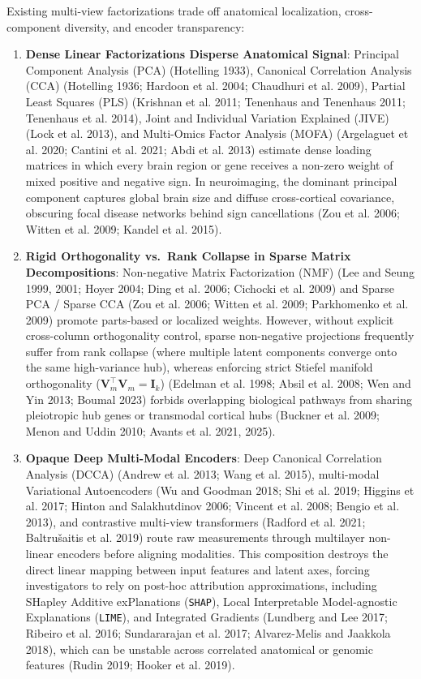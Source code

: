\documentclass[
  10pt,
  letterpaper,
]{report}
\providecommand{\tightlist}{%
  \setlength{\itemsep}{0pt}\setlength{\parskip}{0pt}}
\begin{document}
Existing multi-view factorizations trade off anatomical localization,
cross-component diversity, and encoder transparency:

\begin{enumerate}
\def\labelenumi{\arabic{enumi}.}
\tightlist
\item
  \textbf{Dense Linear Factorizations Disperse Anatomical Signal}:
  Principal Component Analysis (PCA) (Hotelling 1933), Canonical
  Correlation Analysis (CCA) (Hotelling 1936; Hardoon et al. 2004;
  Chaudhuri et al. 2009), Partial Least Squares (PLS) (Krishnan et al.
  2011; Tenenhaus and Tenenhaus 2011; Tenenhaus et al. 2014), Joint and
  Individual Variation Explained (JIVE) (Lock et al. 2013), and
  Multi-Omics Factor Analysis (MOFA) (Argelaguet et al. 2020; Cantini et
  al. 2021; Abdi et al. 2013) estimate dense loading matrices in which
  every brain region or gene receives a non-zero weight of mixed
  positive and negative sign. In neuroimaging, the dominant principal
  component captures global brain size and diffuse cross-cortical
  covariance, obscuring focal disease networks behind sign cancellations
  (Zou et al. 2006; Witten et al. 2009; Kandel et al. 2015).
\item
  \textbf{Rigid Orthogonality vs.~Rank Collapse in Sparse Matrix
  Decompositions}: Non-negative Matrix Factorization (NMF) (Lee and
  Seung 1999, 2001; Hoyer 2004; Ding et al. 2006; Cichocki et al. 2009)
  and Sparse PCA / Sparse CCA (Zou et al. 2006; Witten et al. 2009;
  Parkhomenko et al. 2009) promote parts-based or localized weights.
  However, without explicit cross-column orthogonality control, sparse
  non-negative projections frequently suffer from rank collapse (where
  multiple latent components converge onto the same high-variance hub),
  whereas enforcing strict Stiefel manifold orthogonality
  (\(\mathbf{V}_m^\top \mathbf{V}_m = \mathbf{I}_k\)) (Edelman et al.
  1998; Absil et al. 2008; Wen and Yin 2013; Boumal 2023) forbids
  overlapping biological pathways from sharing pleiotropic hub genes or
  transmodal cortical hubs (Buckner et al. 2009; Menon and Uddin 2010;
  Avants et al. 2021, 2025).
\item
  \textbf{Opaque Deep Multi-Modal Encoders}: Deep Canonical Correlation
  Analysis (DCCA) (Andrew et al. 2013; Wang et al. 2015), multi-modal
  Variational Autoencoders (Wu and Goodman 2018; Shi et al. 2019;
  Higgins et al. 2017; Hinton and Salakhutdinov 2006; Vincent et al.
  2008; Bengio et al. 2013), and contrastive multi-view transformers
  ({Radford et al.} 2021; Baltrušaitis et al. 2019) route raw
  measurements through multilayer non-linear encoders before aligning
  modalities. This composition destroys the direct linear mapping
  between input features and latent axes, forcing investigators to rely
  on post-hoc attribution approximations, including SHapley Additive
  exPlanations (\texttt{SHAP}), Local Interpretable Model-agnostic
  Explanations (\texttt{LIME}), and Integrated Gradients (Lundberg and
  Lee 2017; Ribeiro et al. 2016; Sundararajan et al. 2017; Alvarez-Melis
  and Jaakkola 2018), which can be unstable across correlated anatomical
  or genomic features (Rudin 2019; Hooker et al. 2019).
\end{enumerate}
\end{document}
